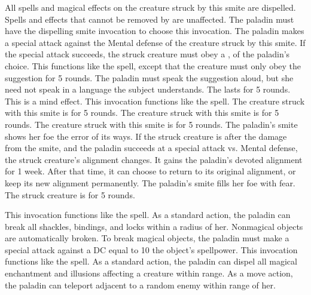 All spells and magical effects on the creature struck by this smite are dispelled.
Spells and effects that cannot be removed by  are unaffected.
The paladin must have the dispelling smite invocation to choose this invocation.
The paladin makes a special attack against the Mental defense of the creature struck by this smite.
If the special attack succeeds, the struck creature must obey a , of the paladin's choice.
This functions like the  spell, except that the creature must only obey the suggestion for 5 rounds.
The paladin must speak the suggestion aloud, but she need not speak in a language the subject understands.
The  lasts for 5 rounds.
This is a mind effect.
 This invocation functions like the  spell.
The creature struck with this smite is \disoriented for 5 rounds.
The creature struck with this smite is \staggered for 5 rounds.
The creature struck with this smite is \immobilized for 5 rounds.
The paladin's smite shows her foe the error of its ways.
If the struck creature is \bloodied after the damage from the smite, and the paladin succeeds at a special attack vs. Mental defense, the struck creature's alignment changes.
It gains the paladin's devoted alignment for 1 week.
After that time, it can choose to return to its original alignment, or keep its new alignment permanently.
The paladin's smite fills her foe with fear.
The struck creature is \frightened for 5 rounds.

 This invocation functions like the 
spell.
As a standard action, the paladin can break all shackles, bindings, and locks within a \arealarge radius of her.
Nonmagical objects are automatically broken.
To break magical objects, the paladin must make a special attack against a DC equal to 10 \add the object's spellpower.
 This invocation functions like the  spell.
As a standard action, the paladin can dispel all magical enchantment and illusions affecting a creature within \rngmed range.
As a move action, the paladin can teleport adjacent to a random enemy within \rngmed range of her.

